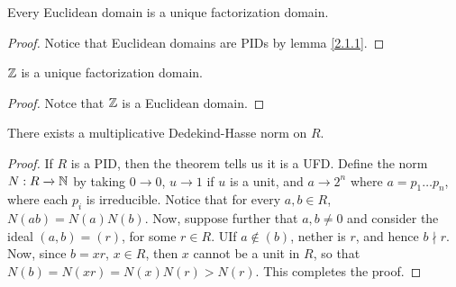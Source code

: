 \begin{corollary}
    Every Euclidean domain is a unique factorization domain.
\end{corollary}
\begin{proof}
    Notice that Euclidean domains are PIDs by lemma \ref{2.1.1}.
\end{proof}
\begin{corollary}
    $\mathbb{Z}$ is a unique factorization domain.
\end{corollary}
\begin{proof}
    Notce that $\mathbb{Z}$ is a Euclidean domain.
\end{proof}
\begin{corollary}
    There exists a multiplicative Dedekind-Hasse norm on $R$.
\end{corollary}
\begin{proof}
    If $R$ is a PID, then the theorem tells us it is a UFD. Define the norm $N:R
    \xrightarrow{} \mathbb{N}$ by taking $0 \xrightarrow{} 0$, $u \xrightarrow{} 1$ if
    $u$ is a unit, and  $a \xrightarrow{} 2^n$ where $a=p_1 \dots p_n$, where
    each $p_i$ is irreducible. Notice that for every  $a,b \in R$,
    $N(ab)=N(a)N(b)$. Now, suppose further that $a,b \neq 0$ and consider the
    ideal  $(a,b)=(r)$, for some $r \in R$. UIf  $a \notin (b)$, nether is $r$,
    and hence  $b \nmid r$. Now, since  $b=xr$,  $x \in R$, then  $x$ cannot be
    a unit in  $R$, so that  $N(b)=N(xr)=N(x)N(r)>N(r)$. This completes the
    proof.
\end{proof}
